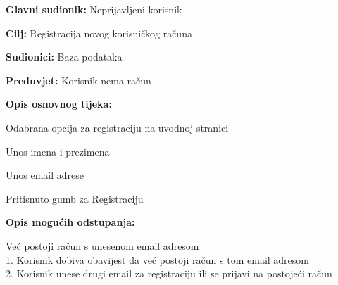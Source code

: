 					
					\noindent {}
					\begin{packed_item}
						\item \textbf{Glavni sudionik:} Neprijavljeni korisnik
						\item \textbf{Cilj:} Registracija novog korisničkog računa
						\item \textbf{Sudionici:} Baza podataka
						\item \textbf{Preduvjet:} Korisnik nema račun
						\item \textbf{Opis osnovnog tijeka:}
						\begin{packed_enum}
							\item Odabrana opcija za registraciju na uvodnoj stranici
							\item Unos imena i prezimena
							\item Unos email adrese
							\item Pritisnuto gumb za Registraciju
						\end{packed_enum}
						\item \textbf{Opis mogućih odstupanja:}
						\begin{packed_item}
							\item[3.a] Već postoji račun s unesenom email adresom
							\\1. Korisnik dobiva obavijest da već postoji račun s tom email adresom
							\\2. Korisnik unese drugi email za registraciju ili se prijavi na postojeći račun
						\end{packed_item}
					\end{packed_item}
					
